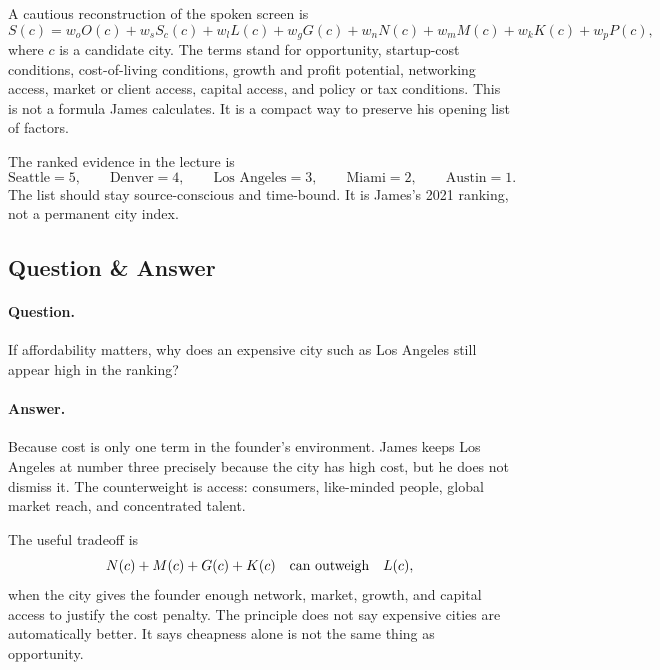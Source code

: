 \documentclass[11pt,oneside]{book}
\begin{document}
A cautious reconstruction of the spoken screen is
\[
S(c)
=
w_oO(c)
+w_sS_c(c)
+w_lL(c)
+w_gG(c)
+w_nN(c)
+w_mM(c)
+w_kK(c)
+w_pP(c),
\]
where \(c\) is a candidate city. The terms stand for opportunity, startup-cost conditions, cost-of-living conditions, growth and profit potential, networking access, market or client access, capital access, and policy or tax conditions. This is not a formula James calculates. It is a compact way to preserve his opening list of factors.

The ranked evidence in the lecture is
\[
\text{Seattle}=5,\qquad
\text{Denver}=4,\qquad
\text{Los Angeles}=3,\qquad
\text{Miami}=2,\qquad
\text{Austin}=1.
\]
The list should stay source-conscious and time-bound. It is James's 2021 ranking, not a permanent city index.

\subsection{Question \& Answer}

\paragraph{Question.}
If affordability matters, why does an expensive city such as Los Angeles still appear high in the ranking?

\paragraph{Answer.}
Because cost is only one term in the founder's environment. James keeps Los Angeles at number three precisely because the city has high cost, but he does not dismiss it. The counterweight is access: consumers, like-minded people, global market reach, and concentrated talent.

The useful tradeoff is
\[
N(c)+M(c)+G(c)+K(c)
\quad \hbox{can outweigh} \quad
L(c),
\]
when the city gives the founder enough network, market, growth, and capital access to justify the cost penalty. The principle does not say expensive cities are automatically better. It says cheapness alone is not the same thing as opportunity.
\end{document}
